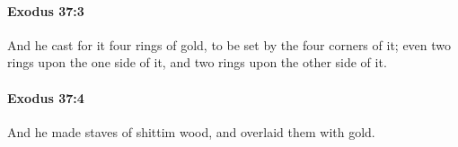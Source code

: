 		\paragraph{Exodus 37:3} %
			\label{EXODUS-37-3}

			And he cast for it four rings of gold, to be set by the four corners of it; even two rings upon the one side of it, and two rings upon the other side of it.


		\paragraph{Exodus 37:4} %
			\label{EXODUS-37-4}

			And he made staves of shittim wood, and overlaid them with gold.


